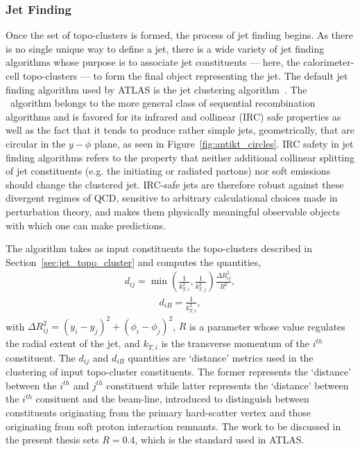 \subsubsection{Jet Finding}
\label{sec:jet_finding}

Once the set of topo-clusters is formed, the process of jet finding begins.
As there is no single unique way to define a jet, there is a wide variety of jet finding algorithms whose
purpose is to associate jet constituents --- here, the calorimeter-cell topo-clusters --- to form
the final object representing the jet.
The default jet finding algorithm used by ATLAS is the
\textit{\antikt} jet clustering algorithm~\cite{Cacciari:2008gp}.
The \antikt~algorithm belongs to the more general class of sequential recombination algorithms
and is favored for its infrared and collinear (IRC) safe properties as well as the fact
that it tends to produce rather simple jets, geometrically, that are circular in the $y-\phi$ plane,
as seen in Figure~\ref{fig:antikt_circles}.
IRC safety in jet finding algorithms refers to the property that neither additional collinear splitting of jet constituents (e.g. the initiating or radiated partons)
nor soft emissions should change the clustered jet.
IRC-safe jets are therefore robust against these divergent regimes of QCD, sensitive to arbitrary
calculational choices made in perturbation theory, and makes them physically  meaningful observable objects
with which one can make predictions.

The \antikt algorithm takes as input constituents the topo-clusters described in Section~\ref{sec:jet_topo_cluster}
and computes the quantities,
\begin{align}
        d_{ij} = \min \left( \frac{1}{k^2_{T,i}} , \frac{1}{k^2_{T,j}} \right) \frac{ \Delta R_{ij}^2}{R^2},
        \label{eq:antikt_0}
\end{align}
\begin{align}
        d_{iB} = \frac{1}{k_{T,i}^2},
        \label{eq:antikt_1}
\end{align}
with $\Delta R_{ij}^2 = (y_i - y_j)^2 + (\phi_i - \phi_j)^2$, $R$ is a parameter whose value regulates the radial extent of
the jet, and $k_{T,i}$ is the transverse momentum of the $i^{th}$ constituent.
The $d_{ij}$ and $d_{iB}$ quantities are `distance' metrics used in the clustering of input topo-cluster constituents.
The former represents the `distance' between the $i^{th}$ and $j^{th}$ constituent while latter represents the
`distance' between the $i^{th}$ consituent and the beam-line, introduced to distinguish between constituents
originating from the primary hard-scatter vertex and those originating from soft proton interaction remnants.
The work to be discussed in the present thesis sets $R=0.4$, which is the standard used in ATLAS.

